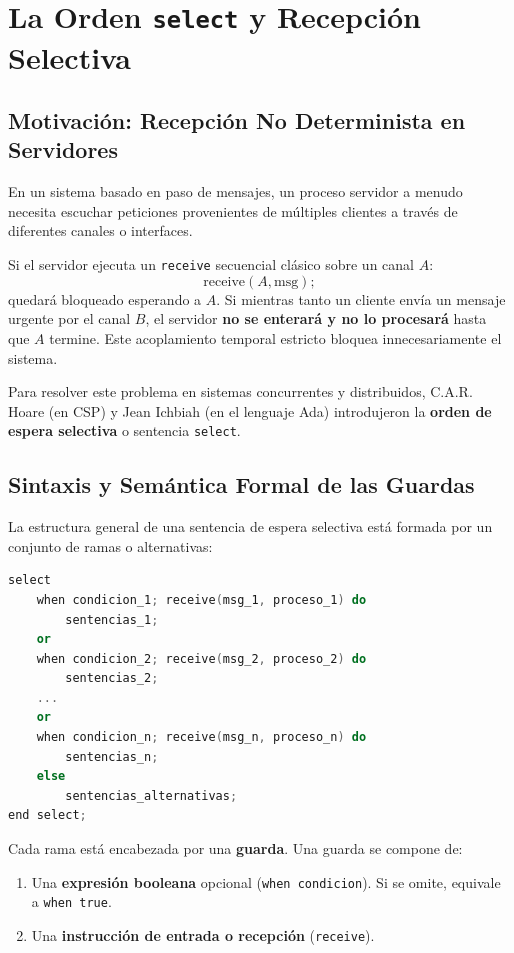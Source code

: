 \section{La Orden \texttt{select} y Recepción Selectiva}

\subsection{Motivación: Recepción No Determinista en Servidores}
En un sistema basado en paso de mensajes, un proceso servidor a menudo necesita escuchar peticiones provenientes de múltiples clientes a través de diferentes canales o interfaces. 

Si el servidor ejecuta un \texttt{receive} secuencial clásico sobre un canal $A$:
\[
\text{receive}(A, \text{msg});
\]
quedará bloqueado esperando a $A$. Si mientras tanto un cliente envía un mensaje urgente por el canal $B$, el servidor \textbf{no se enterará y no lo procesará} hasta que $A$ termine. Este acoplamiento temporal estricto bloquea innecesariamente el sistema.

Para resolver este problema en sistemas concurrentes y distribuidos, C.A.R. Hoare (en CSP) y Jean Ichbiah (en el lenguaje Ada) introdujeron la \textbf{orden de espera selectiva} o sentencia \texttt{select}.

\subsection{Sintaxis y Semántica Formal de las Guardas}
La estructura general de una sentencia de espera selectiva está formada por un conjunto de ramas o alternativas:

\begin{lstlisting}[language=C++]
select
    when condicion_1; receive(msg_1, proceso_1) do
        sentencias_1;
    or
    when condicion_2; receive(msg_2, proceso_2) do
        sentencias_2;
    ...
    or
    when condicion_n; receive(msg_n, proceso_n) do
        sentencias_n;
    else
        sentencias_alternativas;
end select;
\end{lstlisting}

Cada rama está encabezada por una \textbf{guarda}. Una guarda se compone de:
\begin{enumerate}
    \item Una \textbf{expresión booleana} opcional (\texttt{when condicion}). Si se omite, equivale a \texttt{when true}.
    \item Una \textbf{instrucción de entrada o recepción} (\texttt{receive}).
\end{enumerate}

